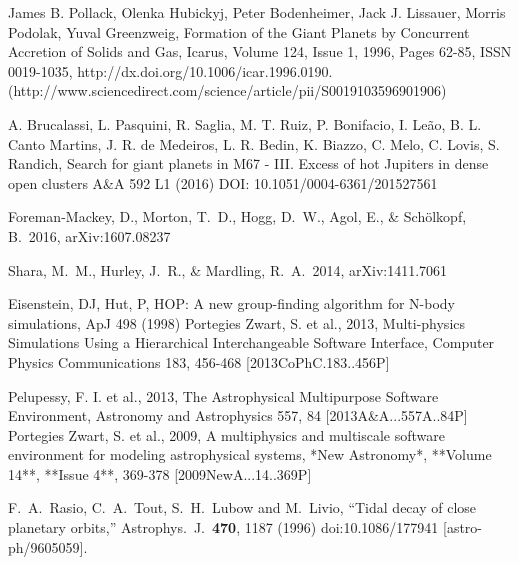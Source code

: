 \documentclass[12pt]{article}
\begin{document}
\begin{thebibliography}{9}

James B. Pollack, Olenka Hubickyj, Peter Bodenheimer, Jack J. Lissauer, Morris Podolak, Yuval Greenzweig, Formation of the Giant Planets by Concurrent Accretion of Solids and Gas, Icarus, Volume 124, Issue 1, 1996, Pages 62-85, ISSN 0019-1035, http://dx.doi.org/10.1006/icar.1996.0190.
(http://www.sciencedirect.com/science/article/pii/S0019103596901906)

A.  Brucalassi, L.  Pasquini, R.  Saglia, M. T.  Ruiz, P.  Bonifacio, I.  Leão, B. L.  Canto Martins, J. R.  de Medeiros, L. R.  Bedin, K.  Biazzo, C.  Melo, C.  Lovis, S.  Randich,
Search for giant planets in M67 - III. Excess of hot Jupiters in dense open clusters
A\&A 592 L1 (2016)
DOI: 10.1051/0004-6361/201527561

Foreman-Mackey, D., Morton, T.~D., Hogg, D.~W., Agol, E., \& Sch{\"o}lkopf, B.\ 2016, arXiv:1607.08237 

 Shara, M.~M., Hurley, J.~R., \& Mardling, R.~A.\ 2014, arXiv:1411.7061 

 Eisenstein, DJ, Hut, P, HOP: A new group-finding algorithm for N-body simulations, ApJ 498 (1998)
 Portegies Zwart, S. et al., 2013, Multi-physics Simulations Using a Hierarchical Interchangeable Software Interface, Computer Physics Communications 183, 456-468 [2013CoPhC.183..456P]
		
 Pelupessy, F. I. et al., 2013, The Astrophysical Multipurpose Software Environment, Astronomy and Astrophysics 557, 84 [2013A\&A...557A..84P]
 Portegies Zwart, S. et al., 2009, A multiphysics and multiscale software environment for modeling astrophysical systems, *New Astronomy*, **Volume 14**, **Issue 4**, 369-378 [2009NewA...14..369P]

  F.~A.~Rasio, C.~A.~Tout, S.~H.~Lubow and M.~Livio,
  ``Tidal decay of close planetary orbits,''
  Astrophys.\ J.\  {\bf 470}, 1187 (1996)
  doi:10.1086/177941
  [astro-ph/9605059].

\end{thebibliography}
\end{document}
